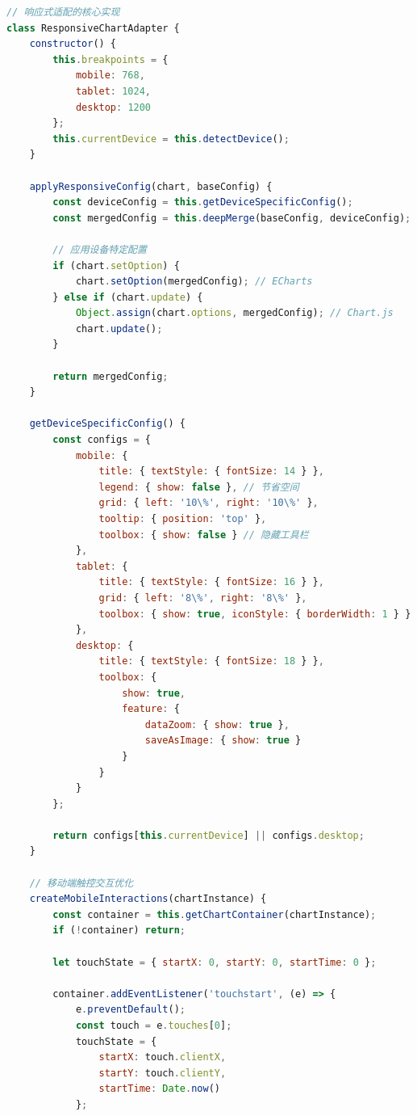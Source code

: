 \begin{lstlisting}[language=Javascript]
// 响应式适配的核心实现
class ResponsiveChartAdapter {
    constructor() {
        this.breakpoints = {
            mobile: 768,
            tablet: 1024,
            desktop: 1200
        };
        this.currentDevice = this.detectDevice();
    }
    
    applyResponsiveConfig(chart, baseConfig) {
        const deviceConfig = this.getDeviceSpecificConfig();
        const mergedConfig = this.deepMerge(baseConfig, deviceConfig);
        
        // 应用设备特定配置
        if (chart.setOption) {
            chart.setOption(mergedConfig); // ECharts
        } else if (chart.update) {
            Object.assign(chart.options, mergedConfig); // Chart.js
            chart.update();
        }
        
        return mergedConfig;
    }
    
    getDeviceSpecificConfig() {
        const configs = {
            mobile: {
                title: { textStyle: { fontSize: 14 } },
                legend: { show: false }, // 节省空间
                grid: { left: '10\%', right: '10\%' },
                tooltip: { position: 'top' },
                toolbox: { show: false } // 隐藏工具栏
            },
            tablet: {
                title: { textStyle: { fontSize: 16 } },
                grid: { left: '8\%', right: '8\%' },
                toolbox: { show: true, iconStyle: { borderWidth: 1 } }
            },
            desktop: {
                title: { textStyle: { fontSize: 18 } },
                toolbox: {
                    show: true,
                    feature: {
                        dataZoom: { show: true },
                        saveAsImage: { show: true }
                    }
                }
            }
        };
        
        return configs[this.currentDevice] || configs.desktop;
    }
    
    // 移动端触控交互优化
    createMobileInteractions(chartInstance) {
        const container = this.getChartContainer(chartInstance);
        if (!container) return;
        
        let touchState = { startX: 0, startY: 0, startTime: 0 };
        
        container.addEventListener('touchstart', (e) => {
            e.preventDefault();
            const touch = e.touches[0];
            touchState = {
                startX: touch.clientX,
                startY: touch.clientY,
                startTime: Date.now()
            };
            

\end{lstlisting}
